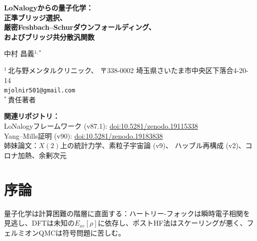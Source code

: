 \documentclass[12pt]{article}
\theoremstyle{plain}
\theoremstyle{definition}
\numberwithin{equation}{section}
\DeclareMathOperator{\Ran}{Ran}
\begin{document}
\begin{titlepage}
\centering
\vspace*{0.8cm}
{\LARGE\bfseries LoNalogyからの量子化学：\\[6pt]
正準ブリッジ選択、\\[6pt]
厳密Feshbach--Schurダウンフォールディング、\\[6pt]
およびブリッジ共分散汎関数}
\vspace{1.2cm}

{\large 中村 昌義$^{1,*}$}
\vspace{0.6cm}

{\normalsize
$^1$\,北与野メンタルクリニック、
〒338-0002 埼玉県さいたま市中央区下落合4-20-14\\
\texttt{mjolnir501@gmail.com}\\[4pt]
$^*$\,責任著者
}
\vspace{0.6cm}

{\small
\noindent\textbf{関連リポジトリ：}\\
LoNalogyフレームワーク (v87.1):
\href{https://doi.org/10.5281/zenodo.19115338}{doi:10.5281/zenodo.19115338}\\
Yang--Mills証明 (v90):
\href{https://doi.org/10.5281/zenodo.19183838}{doi:10.5281/zenodo.19183838}\\
姉妹論文：$X(2)$上の統計力学、素粒子宇宙論 (v9)、
ハッブル再構成 (v2)、コロナ加熱、余剰次元
}
\vspace{0.8cm}

\begin{abstract}
\noindent
LoNalogyの三セクターフレームワークを量子化学に適用する。
\textbf{(A)} 任意の活性空間射影$P_A$に対し正準ブリッジ射影
$P_B:=\Pi_{\Ran(QHP_A)}$が定義され、厳密な三セクター
Feshbach--Schurダウンフォールディングが
CASPT2/NEVPT2/DUCCの代数的母式を与える。
\textbf{(B)} 隠れたモード消去からの厳密相関補正は系依存ブリッジ
共分散汎関数であり、普遍的固定カーネル$E_{xc}$はno-go。
\textbf{(C)} 修正P\"oschl--Tellerポテンシャルは停留点における
4次一致の局所標準形であるが、普遍的PES法則ではない（no-go）。
\end{abstract}
\end{titlepage}

\setcounter{page}{1}
\tableofcontents
\newpage

\section*{序論}

量子化学は計算困難の階層に直面する：ハートリー-フォックは瞬時電子相関を見逃し、DFTは未知の$E_{xc}[\rho]$に依存し、ポストHF法はスケーリングが悪く、フェルミオンQMCは符号問題に苦しむ。
\end{document}
